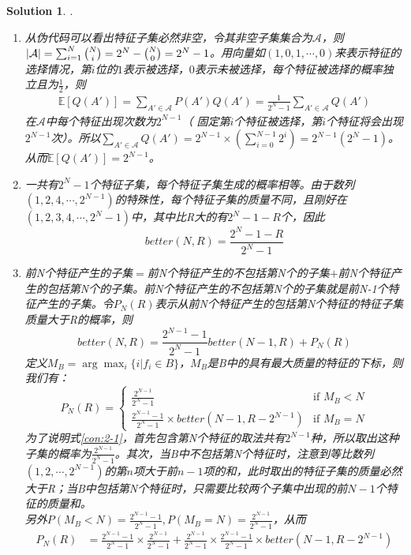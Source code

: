 \documentclass[a4paper,UTF8]{article}
\newtheorem*{solution}{Solution}
\numberwithin{equation}{section}
\begin{document}
\begin{solution}.
\begin{enumerate}[$(1)$]
	\item 从伪代码可以看出特征子集必然非空，令其非空子集集合为$\mathcal{A}$，则$|\mathcal{A}|=\sum_{i=1}^{N}\tbinom{N}{i}=2^N-\tbinom{N}{0}=2^N-1$。用向量如$(1,0,1,\cdots,0)$来表示特征的选择情况，第$i$位的$1$表示被选择，$0$表示未被选择，每个特征被选择的概率独立且为$\frac{1}{2}$，则
	\begin{align*}
	 \mathbb{E}[Q(A')]=\sum_{A'\in\mathcal{A}}P(A')Q(A')=\frac{1}{2^N-1}\sum_{A'\in\mathcal{A}}Q(A')
	\end{align*}
    在$\mathcal{A}$中每个特征出现次数为$2^{N-1}$（ 固定第$i$个特征被选择，第$i$个特征将会出现$2^{N-1}$次）。所以$\sum_{A'\in\mathcal{A}}Q(A')=2^{N-1}\times(\sum_{i=0}^{N-1}2^i)=2^{N-1}(2^{N}-1)$。从而$\mathbb{E}[Q(A')]=2^{N-1}$。
    \item 一共有$2^N-1$个特征子集，每个特征子集生成的概率相等。由于数列$(1,2,4,\cdots,2^{N-1})$的特殊性，每个特征子集的质量不同，且刚好在$(1,2,3,4,\cdots,2^N-1)$中，其中比R大的有$2^N-1-R$个，因此
    $$better(N,R)=\frac{2^N-1-R}{2^N-1}$$
    \item 前N个特征产生的子集$=$前N个特征产生的不包括第N个的子集$+$前N个特征产生的包括第N个的子集。前N个特征产生的不包括第N个的子集就是前N-1个特征产生的子集。令$P_N(R)$表示从前N个特征产生的包括第N个特征的特征子集质量大于R的概率，则
    $$better(N,R)=\frac{2^{N-1}-1}{2^N-1}better(N-1,R)+P_N(R)$$
    定义$M_B=\arg\max_i \{i|f_i\in B\}$，$M_B$是B中的具有最大质量的特征的下标，则我们有：
    \begin{equation}
    	P_N(R)=
    	\begin{cases}
    		\frac{2^{N-1}}{2^N-1} & \text{if }M_B<N \\
    		\frac{2^{N-1}-1}{2^{N}-1}\times better(N-1,R-2^{N-1}) &\text{if } M_B=N 
    	\end{cases}\label{con:2-1}
    \end{equation}
    为了说明式\ref{con:2-1}，首先包含第N个特征的取法共有$2^{N-1}$种，所以取出这种子集的概率为$\frac{2^{N-1}}{2^N-1}$。其次，当B中不包括第N个特征时，注意到等比数列$(1,2,\cdots,2^{N-1})$的第$n$项大于前$n-1$项的和，此时取出的特征子集的质量必然大于R；当B中包括第N个特征时，只需要比较两个子集中出现的前$N-1$个特征的质量和。\\
    另外$P(M_B<N)=\frac{2^{N-1}-1}{2^N-1},P(M_B=N)=\frac{2^{N-1}}{2^N-1}$，从而
    \begin{align*}
    	P_N(R)&=\frac{2^{N-1}-1}{2^N-1}\times\frac{2^{N-1}}{2^N-1}+
    	\frac{2^{N-1}}{2^N-1}\times\frac{2^{N-1}-1}{2^N-1}\times better(N-1,R-2^{N-1})

\end{align*}
\end{enumerate}
\end{solution}
\end{document}
